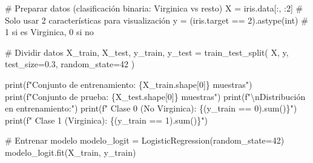 \documentclass[
  doc,
  floatsintext,
  longtable,
  a4paper,
  nolmodern,
  notxfonts,
  notimes,
  12pt,
  colorlinks=true,linkcolor=blue,citecolor=blue,urlcolor=blue]{apa7}
\newenvironment{Shaded}{\begin{snugshade}}{\end{snugshade}}
\newcommand{\BuiltInTok}[1]{\textcolor[rgb]{0.00,0.23,0.31}{#1}}
\newcommand{\CharTok}[1]{\textcolor[rgb]{0.13,0.47,0.30}{#1}}
\newcommand{\CommentTok}[1]{\textcolor[rgb]{0.37,0.37,0.37}{#1}}
\newcommand{\DecValTok}[1]{\textcolor[rgb]{0.68,0.00,0.00}{#1}}
\newcommand{\FloatTok}[1]{\textcolor[rgb]{0.68,0.00,0.00}{#1}}
\newcommand{\NormalTok}[1]{\textcolor[rgb]{0.00,0.23,0.31}{#1}}
\newcommand{\OperatorTok}[1]{\textcolor[rgb]{0.37,0.37,0.37}{#1}}
\newcommand{\SpecialCharTok}[1]{\textcolor[rgb]{0.37,0.37,0.37}{#1}}
\newcommand{\SpecialStringTok}[1]{\textcolor[rgb]{0.13,0.47,0.30}{#1}}
\begin{document}
\begin{Shaded}
\begin{Highlighting}[]
\CommentTok{\# Preparar datos (clasificación binaria: Virginica vs resto)}
\NormalTok{X }\OperatorTok{=}\NormalTok{ iris.data[:, :}\DecValTok{2}\NormalTok{]  }\CommentTok{\# Solo usar 2 características para visualización}
\NormalTok{y }\OperatorTok{=}\NormalTok{ (iris.target }\OperatorTok{==} \DecValTok{2}\NormalTok{).astype(}\BuiltInTok{int}\NormalTok{)  }\CommentTok{\# 1 si es Virginica, 0 si no}

\CommentTok{\# Dividir datos}
\NormalTok{X\_train, X\_test, y\_train, y\_test }\OperatorTok{=}\NormalTok{ train\_test\_split(}
\NormalTok{    X, y, test\_size}\OperatorTok{=}\FloatTok{0.3}\NormalTok{, random\_state}\OperatorTok{=}\DecValTok{42}
\NormalTok{)}

\BuiltInTok{print}\NormalTok{(}\SpecialStringTok{f"Conjunto de entrenamiento: }\SpecialCharTok{\{}\NormalTok{X\_train}\SpecialCharTok{.}\NormalTok{shape[}\DecValTok{0}\NormalTok{]}\SpecialCharTok{\}}\SpecialStringTok{ muestras"}\NormalTok{)}
\BuiltInTok{print}\NormalTok{(}\SpecialStringTok{f"Conjunto de prueba: }\SpecialCharTok{\{}\NormalTok{X\_test}\SpecialCharTok{.}\NormalTok{shape[}\DecValTok{0}\NormalTok{]}\SpecialCharTok{\}}\SpecialStringTok{ muestras"}\NormalTok{)}
\BuiltInTok{print}\NormalTok{(}\SpecialStringTok{f"}\CharTok{\textbackslash{}n}\SpecialStringTok{Distribución en entrenamiento:"}\NormalTok{)}
\BuiltInTok{print}\NormalTok{(}\SpecialStringTok{f"  Clase 0 (No Virginica): }\SpecialCharTok{\{}\NormalTok{(y\_train }\OperatorTok{==} \DecValTok{0}\NormalTok{)}\SpecialCharTok{.}\BuiltInTok{sum}\NormalTok{()}\SpecialCharTok{\}}\SpecialStringTok{"}\NormalTok{)}
\BuiltInTok{print}\NormalTok{(}\SpecialStringTok{f"  Clase 1 (Virginica): }\SpecialCharTok{\{}\NormalTok{(y\_train }\OperatorTok{==} \DecValTok{1}\NormalTok{)}\SpecialCharTok{.}\BuiltInTok{sum}\NormalTok{()}\SpecialCharTok{\}}\SpecialStringTok{"}\NormalTok{)}

\CommentTok{\# Entrenar modelo}
\NormalTok{modelo\_logit }\OperatorTok{=}\NormalTok{ LogisticRegression(random\_state}\OperatorTok{=}\DecValTok{42}\NormalTok{)}
\NormalTok{modelo\_logit.fit(X\_train, y\_train)}


\end{Highlighting}
\end{Shaded}
\end{document}

